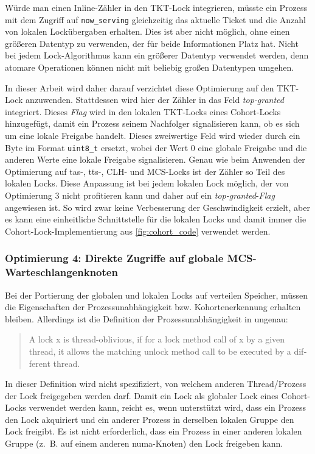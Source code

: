 Würde man einen Inline-Zähler in den TKT-Lock integrieren,
müsste ein Prozess mit dem Zugriff auf \texttt{now\_serving}
gleichzeitig das aktuelle Ticket
und die Anzahl von lokalen Lockübergaben erhalten.
Dies ist aber nicht möglich,
ohne einen größeren Datentyp zu verwenden,
der für beide Informationen Platz hat.
Nicht bei jedem Lock-Algorithmus kann ein größerer Datentyp verwendet werden,
denn atomare Operationen können nicht mit beliebig großen Datentypen umgehen.

In dieser Arbeit wird daher darauf verzichtet diese Optimierung auf den TKT-Lock anzuwenden.
Stattdessen wird hier der Zähler in das Feld \textit{top-granted} integriert.
Dieses \textit{Flag} wird in \cite{Cohort-Lock} den lokalen TKT-Locks eines Cohort-Locks hinzugefügt,
damit ein Prozess seinem Nachfolger signalisieren kann,
ob es sich um eine lokale Freigabe handelt.
Dieses zweiwertige Feld wird wieder durch ein Byte im Format \texttt{uint8\_t} ersetzt,
wobei der Wert 0 eine globale Freigabe
und die anderen Werte eine lokale Freigabe signalisieren.
Genau wie beim Anwenden der Optimierung auf \gls{tas}-, \gls{tts}-, CLH- und MCS-Locks
ist der Zähler so Teil des lokalen Locks.
Diese Anpassung ist bei jedem lokalen Lock möglich,
der von Optimierung 3 nicht profitieren kann
und daher auf ein \textit{top-granted}-\textit{Flag} angewiesen ist.
So wird zwar keine Verbesserung der Geschwindigkeit erzielt,
aber es kann eine einheitliche Schnittstelle für die lokalen Locks
und damit immer die Cohort-Lock-Implementierung aus \autoref{fig:cohort_code} verwendet werden.

\subsubsection{Optimierung 4: Direkte Zugriffe auf globale MCS-Warteschlangenknoten}
\label{sec:cohort_opt_4}

Bei der Portierung der globalen und lokalen Locks auf verteilen Speicher,
müssen die Eigenschaften der Prozessunabhängigkeit bzw. Kohortenerkennung erhalten bleiben.
Allerdings ist die Definition der Prozessunabhängigkeit in \cite{Cohort-Lock} ungenau:
\foreignblockquote{english}{%
    A lock x is thread-oblivious,
    if \textelp{} for a lock method call of x by a given thread,
    it allows the matching unlock method call \textelp{} to be executed by a different thread.}
In dieser Definition wird nicht spezifiziert,
von welchem anderen Thread/Prozess der Lock freigegeben werden darf.
Damit ein Lock als globaler Lock eines Cohort-Locks verwendet werden kann,
reicht es,
wenn unterstützt wird,
dass ein Prozess den Lock akquiriert
und ein anderer Prozess in derselben lokalen Gruppe den Lock freigibt.
Es ist nicht erforderlich,
dass ein Prozess in einer anderen lokalen Gruppe
(z.~B. auf einem anderen \gls{numa}-Knoten)
den Lock freigeben kann.

